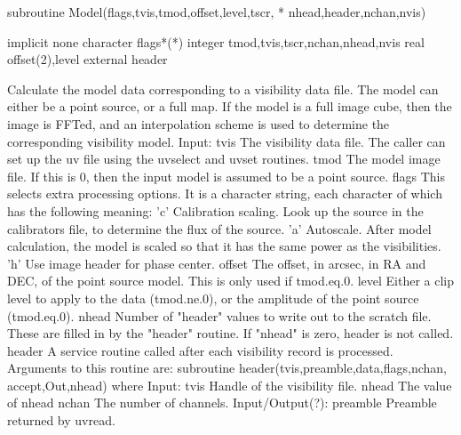 \par{\tenpoint
{\eightpoint\begintt
        subroutine Model(flags,tvis,tmod,offset,level,tscr,
     *                                  nhead,header,nchan,nvis)

        implicit none
        character flags*(*)
        integer tmod,tvis,tscr,nchan,nhead,nvis
        real offset(2),level
        external header
\endtt}
{\eightpoint\begintt
  Calculate the model data corresponding to a visibility data file.
  The model can either be a point source, or a full map. If the model
  is a full image cube, then the image is FFTed, and an interpolation
  scheme is used to determine the corresponding visibility model.
\endtt}
{\eightpoint\begintt
  Input:
    tvis       The visibility data file. The caller can set up the uv file
               using the uvselect and uvset routines.
\endtt}
{\eightpoint\begintt
    tmod       The model image file. If this is 0, then the input model
               is assumed to be a point source.
\endtt}
{\eightpoint\begintt
    flags      This selects extra processing options. It is a character
               string, each character of which has the following meaning:
                'c'  Calibration scaling. Look up the source in the
                     calibrators file, to determine the flux of the source.
                'a'  Autoscale. After model calculation, the model is scaled
                     so that it has the same power as the visibilities.
                'h'    Use image header for phase center.
\endtt}
{\eightpoint\begintt
    offset     The offset, in arcsec, in RA and DEC, of the point
               source model. This is only used if tmod.eq.0.
\endtt}
{\eightpoint\begintt
    level      Either a clip level to apply to the data (tmod.ne.0), or
               the amplitude of the point source (tmod.eq.0).
\endtt}
{\eightpoint\begintt
    nhead      Number of "header" values to write out to the scratch file.
               These are filled in by the "header" routine. If "nhead" is
               zero, header is not called.
\endtt}
{\eightpoint\begintt
    header     A service routine called after each visibility record
               is processed. Arguments to this routine are:
                 subroutine header(tvis,preamble,data,flags,nchan,
                   accept,Out,nhead)
               where
                 Input:
                   tvis        Handle of the visibility file.
                   nhead       The value of nhead
                   nchan       The number of channels.
                 Input/Output(?):
                   preamble    Preamble returned by uvread.
}}
